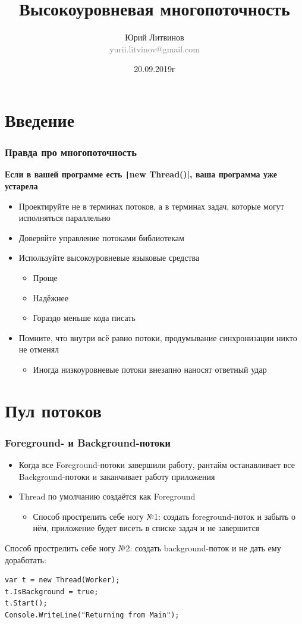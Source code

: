 \documentclass[xetex,mathserif,serif]{beamer}
\title{Высокоуровневая многопоточность}
\author[Юрий Литвинов]{Юрий Литвинов\\\small{\textcolor{gray}{yurii.litvinov@gmail.com}}}
\date{20.09.2019г}
\begin{document}
	\frame{\titlepage}

	\section{Введение}

	\begin{frame}
		\frametitle{Правда про многопоточность}
		\textbf{Если в вашей программе есть \texttt|new Thread()|, ваша программа уже устарела}
		\begin{itemize}
			\item Проектируйте не в терминах потоков, а в терминах задач, которые могут исполняться параллельно
			\item Доверяйте управление потоками библиотекам
			\item Используйте высокоуровневые языковые средства
			\begin{itemize}
				\item Проще
				\item Надёжнее
				\item Гораздо меньше кода писать
			\end{itemize}
			\item Помните, что внутри всё равно потоки, продумывание синхронизации никто не отменял
			\begin{itemize}
				\item Иногда низкоуровневые потоки внезапно наносят ответный удар
			\end{itemize}
		\end{itemize}
	\end{frame}

	\section{Пул потоков}

	\begin{frame}[fragile]
		\frametitle{Foreground- и Background-потоки}
		\begin{itemize}
			\item Когда все Foreground-потоки завершили работу, рантайм останавливает все Background-потоки и заканчивает работу приложения
			\item Thread по умолчанию создаётся как Foreground
			\begin{itemize}
				\item Способ прострелить себе ногу №1: создать foreground-поток и забыть о нём, приложение будет висеть в списке задач и не завершится
			\end{itemize}
		\end{itemize}
		\vspace{5mm}
		Способ прострелить себе ногу №2: создать background-поток и не дать ему доработать:
		\begin{verbatim}
var t = new Thread(Worker);
t.IsBackground = true;
t.Start();
Console.WriteLine("Returning from Main");
		\end{verbatim}
	\end{frame}
\end{document}
